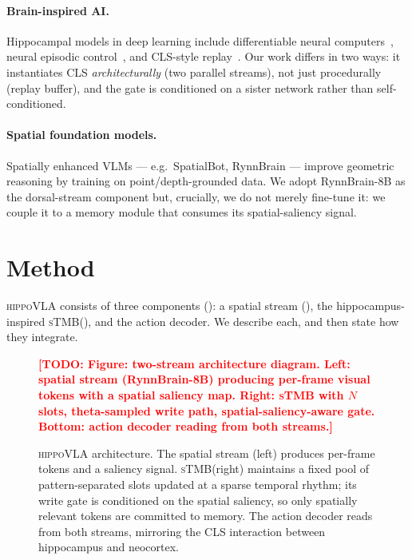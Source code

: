\documentclass[10pt,letterpaper]{article}
\newcommand{\todo}[1]{\textcolor{red}{\textbf{[TODO: #1]}}}
\newcommand{\method}{\textsc{hippoVLA}\xspace}
\newcommand{\sTMB}{\textsc{sTMB}\xspace}
\begin{document}
\paragraph{Brain-inspired AI.}
Hippocampal models in deep learning include differentiable neural computers~\citep{graves2016dnc}, neural episodic control~\citep{pritzel2017nec}, and CLS-style replay~\citep{kumaran2016cls,parisi2019cls}. Our work differs in two ways: it instantiates CLS \emph{architecturally} (two parallel streams), not just procedurally (replay buffer), and the gate is conditioned on a sister network rather than self-conditioned.

\paragraph{Spatial foundation models.}
Spatially enhanced VLMs --- e.g.\ SpatialBot, RynnBrain --- improve geometric reasoning by training on point/depth-grounded data. We adopt RynnBrain-8B as the dorsal-stream component but, crucially, we do not merely fine-tune it: we couple it to a memory module that consumes its spatial-saliency signal.

\section{Method}
\label{sec:method}

\method consists of three components (): a spatial stream (), the hippocampus-inspired \sTMB (), and the action decoder. We describe each, and then state how they integrate.

\begin{figure}[t]
\centering
\todo{Figure: two-stream architecture diagram. Left: spatial stream (RynnBrain-8B) producing per-frame visual tokens with a spatial saliency map. Right: \sTMB with $N$ slots, theta-sampled write path, spatial-saliency-aware gate. Bottom: action decoder reading from both streams.}
\caption{\method architecture. The spatial stream (left) produces per-frame tokens and a saliency signal. \sTMB (right) maintains a fixed pool of pattern-separated slots updated at a sparse temporal rhythm; its write gate is conditioned on the spatial saliency, so only spatially relevant tokens are committed to memory. The action decoder reads from both streams, mirroring the CLS interaction between hippocampus and neocortex.}
\label{fig:arch}
\end{figure}
\end{document}
